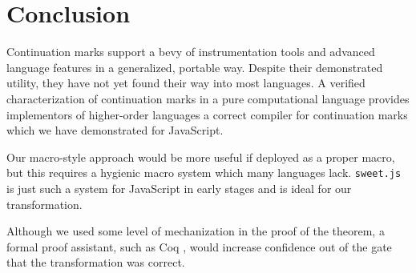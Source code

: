 \chapter{Conclusion}

Continuation marks support a bevy of instrumentation tools and advanced language features in a generalized, portable way. Despite their demonstrated utility, they have not yet found their way into most languages. A verified characterization of continuation marks in a pure computational language provides implementors of higher-order languages a correct compiler for continuation marks which we have demonstrated for JavaScript.

Our macro-style approach would be more useful if deployed as a proper macro, but this requires a hygienic macro system which many languages lack. \texttt{sweet.js} is just such a system for JavaScript in early stages and is ideal for our transformation.

Although we used some level of mechanization in the proof of the theorem, a formal proof assistant, such as Coq \cite{barras1997coq}, would increase confidence out of the gate that the transformation was correct.


